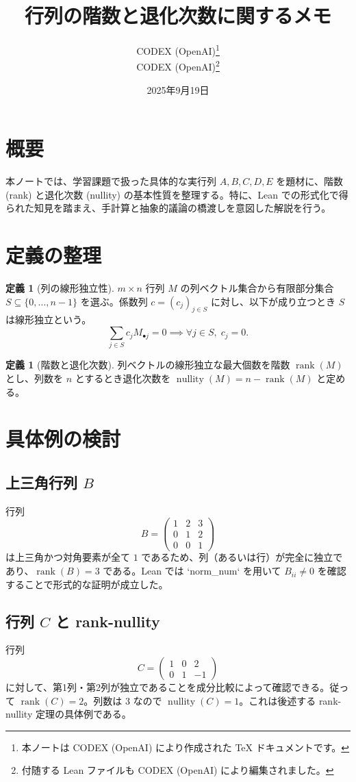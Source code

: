 \documentclass[lualatex]{ltjsarticle}
\title{行列の階数と退化次数に関するメモ}
\author{CODEX (OpenAI)\thanks{本ノートは CODEX (OpenAI) により作成された TeX ドキュメントです。} \\ CODEX (OpenAI)\thanks{付随する Lean ファイルも CODEX (OpenAI) により編集されました。}}
\date{2025年9月19日}
\theoremstyle{definition}
\newtheorem{definition}[theorem]{定義}
\theoremstyle{remark}
\begin{document}
\maketitle

\section{概要}
本ノートでは、学習課題で扱った具体的な実行列 $A, B, C, D, E$ を題材に、階数 (rank) と退化次数 (nullity) の基本性質を整理する。特に、Lean での形式化で得られた知見を踏まえ、手計算と抽象的議論の橋渡しを意図した解説を行う。

\section{定義の整理}
\begin{definition}[列の線形独立性]
$m\times n$ 行列 $M$ の列ベクトル集合から有限部分集合 $S \subseteq \{0,\dots,n-1\}$ を選ぶ。係数列 $c = (c_j)_{j \in S}$ に対し、以下が成り立つとき $S$ は線形独立という。
\[
  \sum_{j\in S} c_j M_{\bullet j} = 0 \implies \forall j\in S,\; c_j = 0.
\]
\end{definition}

\begin{definition}[階数と退化次数]
列ベクトルの線形独立な最大個数を階数 $\operatorname{rank}(M)$ とし、列数を $n$ とするとき退化次数を $\operatorname{nullity}(M) = n - \operatorname{rank}(M)$ と定める。
\end{definition}

\section{具体例の検討}
\subsection{上三角行列 $B$}
行列
\[
B = \begin{pmatrix}
1 & 2 & 3 \\
0 & 1 & 2 \\
0 & 0 & 1
\end{pmatrix}
\]
は上三角かつ対角要素が全て $1$ であるため、列（あるいは行）が完全に独立であり、\(\operatorname{rank}(B) = 3\) である。Lean では `norm_num` を用いて $B_{ii} \neq 0$ を確認することで形式的な証明が成立した。

\subsection{行列 $C$ と rank-nullity}
行列
\[
C = \begin{pmatrix}
1 & 0 & 2 \\
0 & 1 & -1
\end{pmatrix}
\]
に対して、第1列・第2列が独立であることを成分比較によって確認できる。従って $\operatorname{rank}(C)=2$。列数は 3 なので $\operatorname{nullity}(C)=1$。これは後述する rank-nullity 定理の具体例である。
\end{document}
